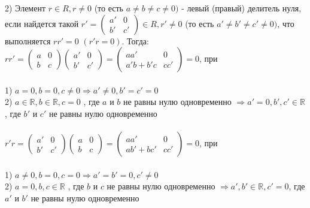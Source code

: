\documentclass[a4paper, 12pt]{article}
\newcommand\tab[1][1cm]{\hspace*{#1}}
\begin{document}
	2) Элемент $r \in R, r \neq 0$ (то есть $a \neq b \neq c \neq 0)$ - левый (правый) делитель нуля, если найдется такой $r' = \begin{pmatrix} a' & 0 \\ b' & c' \end{pmatrix} \in R, r' \neq 0$ (то есть $a' \neq b' \neq c' \neq 0)$, что выполняется $rr' = 0$ $(r'r = 0)$. Тогда: \\
	$rr' = \begin{pmatrix} a & 0 \\ b & c \end{pmatrix} \begin{pmatrix} a' & 0 \\ b' & c' \end{pmatrix} = \begin{pmatrix} aa' & 0 \\ a'b + b'c & cc' \end{pmatrix} = 0$, при \\\\
	\tab 1) $a = 0, b = 0, c \neq 0 \Rightarrow a' \neq 0, b' = c' = 0$ \\
	\tab 2) $a \in \mathbb{R}, b \in \mathbb{R}, c = 0$ , где $a$ и $b$ не равны нулю одновременно $\Rightarrow a' = 0, b', c' \in \mathbb{R}$, где $b'$ и $c'$ не равны нулю одновременно \\\\
	$r'r = \begin{pmatrix} a' & 0 \\ b' & c' \end{pmatrix} \begin{pmatrix} a & 0 \\ b & c \end{pmatrix} = \begin{pmatrix} aa' & 0 \\ ab' + bc' & cc' \end{pmatrix} = 0$, при \\\\
	\tab 1) $a \neq 0, b = 0, c = 0 \Rightarrow a' = b' = 0, c' \neq 0$ \\
	\tab 2) $a = 0, b, c \in \mathbb{R}$ , где $b$ и $c$ не равны нулю одновременно $\Rightarrow a', b' \in \mathbb{R}, c' = 0$, где $a'$ и $b'$ не равны нулю одновременно \\
	
\end{document}
